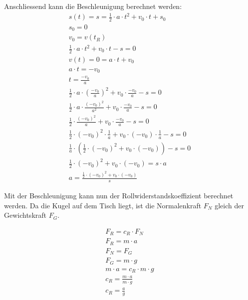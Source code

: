 Anschliessend kann die Beschleunigung berechnet werden:
\begin{align}
    s(t) = s = \frac{1}{2} \cdot a \cdot t^2 + v_0 \cdot t + s_0\\
    s_0 = 0\\
    v_0 = v(t_R)\\
    \frac{1}{2} \cdot a \cdot t^2 + v_0 \cdot t - s = 0\\
    v(t) = 0 = a \cdot t + v_0\\
    a \cdot t = -v_0\\
    t = \frac{-v_0}{a}\\
    \frac{1}{2} \cdot a \cdot (\frac{-v_0}{a})^2 + v_0 \cdot \frac{-v_0}{a} - s = 0\\
    \frac{1}{2} \cdot a \cdot \frac{(-v_0)^2}{a^2} + v_0 \cdot \frac{-v_0}{a} - s = 0\\
    \frac{1}{2} \cdot \frac{(-v_0)^2}{a} + v_0 \cdot \frac{-v_0}{a} - s = 0\\
    \frac{1}{2} \cdot (-v_0)^2 \cdot \frac{1}{a} + v_0 \cdot (-v_0) \cdot \frac{1}{a} - s = 0\\
    \frac{1}{a} \cdot (\frac{1}{2} \cdot (-v_0)^2 + v_0 \cdot (-v_0)) - s = 0\\
    \frac{1}{2} \cdot (-v_0)^2 + v_0 \cdot (-v_0) = s \cdot a\\
    a = \frac{\frac{1}{2} \cdot (-v_0)^2 + v_0 \cdot (-v_0)}{s}
\end{align}

Mit der Beschleunigung kann nun der Rollwiderstandskoeffizient berechnet werden.
Da die Kugel auf dem Tisch liegt, ist die Normalenkraft $F_N$ gleich der Gewichtskraft $F_G$.

\begin{align}
    F_R = c_R \cdot F_N\\
    F_R = m \cdot a\\
    F_N = F_G\\
    F_G = m \cdot g\\
    m \cdot a = c_R \cdot m \cdot g\\
    c_R = \frac{m \cdot a}{m \cdot g}\\
    c_R = \frac{a}{g}
\end{align}

